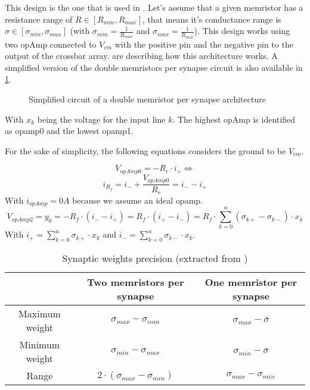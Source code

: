 This design is the one that is used in \cite{doubleMem}. Let's assume that a given memristor has a resistance range of $R\in[R_{min},R_{max}]$, that means it's conductance range is $\sigma \in [\sigma_{min},\sigma_{max}]$ (with $\sigma_{min}= \frac{1}{R_{max}}$ and $\sigma_{max}= \frac{1}{R_{min}}$). This design works using two \ac{opAmp} connected to $V_{cm}$ with the positive pin and the negative pin to the output of the crossbar array.  are describing how this architecture works. A simplified version of the double memristors per synapse circuit is also available in \cref{circt:doubleMem}.

\begin{figure}[H]
  \centering
  
  \caption{Simplified circuit of a double memristor per synapse architecture}
  \label{circt:doubleMem}
\end{figure}

With $x_k$ being the voltage for the input line $k$. The highest \ac{opAmp} is identified as opamp0 and the lowest opamp1.

For the sake of simplicity, the following equations considers the ground to be $V_{cm}$.

\begin{equation}
  \label{eq:doubleMem0}
  V_{opAmp0}=-R_r\cdot i_+ \Leftrightarrow
\end{equation}
\begin{equation}
  \label{eq:doubleMem1}
  i_{R_f}=i_-+\frac{V_{opAmp0}}{R_r}=i_--i_+
\end{equation}
With $i_{opAmp}=0A$ because we assume an ideal \ac{opamp}.
\begin{equation}
  \label{eq:doubleMem2}
  V_{opAmp2}=y_0=-R_f\cdot(i_--i_+)=R_f\cdot(i_+-i_-)=R_f\cdot\sum_{k=0}^n(\sigma_{k+}-\sigma_{k-})\cdot x_k
\end{equation}
With $i_+=\sum_{k=0}^n\sigma_{k+}\cdot x_k$ and $i_-=\sum_{k=0}^n\sigma_{k-}\cdot x_k$.


\begin{table}[H]
  \centering
  \begin{tabular}{|c|c|c|}
    \cline{2-3}
    \rowcolor{gray}
    \multicolumn{1}{c|}{\cellcolor[HTML]{FFFFFF}} & Two memristors per synapse & One memristor per synapse \\
    \hline
    Maximum weight & $\sigma_{max}-\sigma_{min}$ & $\sigma_{max} -\overline{\sigma}$\\
    \hline
    Minimum weight & $\sigma_{min}-\sigma_{max}$ & $\sigma_{min} -\overline{\sigma}$\\
    \hline
    Range & $2\cdot(\sigma_{max}-\sigma_{min})$&$\sigma_{max}-\sigma_{min}$\\
    \hline
  \end{tabular}
  \caption{Synaptic weights precision (extracted from \cite{doubleMem})}
  \label{tab:synapses}
\end{table}

